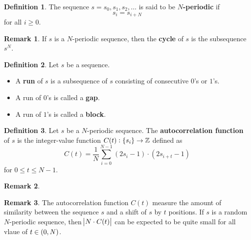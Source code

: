 \documentclass[12pt,openany]{book}
\theoremstyle{definition}
\newtheorem{definition}{Definition}[chapter]
\newtheorem{remark}{Remark}[chapter]
\newcommand{\Z}{\mathbb{Z}}
\begin{document}
	\begin{tcolorbox}[colback=white,colframe=defcolor,arc=5pt,title={\color{white}\bf $N$-Periodic}]
		\begin{definition}
			The sequence $s=s_0,s_1,s_2,\dots$ is said to be \textbf{$N$-periodic} if \[
			s_i=s_{i+N}
			\] for all $i\geq 0$.
		\end{definition}
	\end{tcolorbox}
	\begin{remark}
		If $s$ is a $N$-periodic sequence, then the \textbf{cycle} of $s$ is the subsequence $s^N$.
	\end{remark}
	\vspace{12pt}
	\begin{tcolorbox}[colback=white,colframe=defcolor,arc=5pt,title={\color{white}\bf Run - Gap / Block}]
		\begin{definition}
			Let $s$ be a sequence. \begin{itemize}
				\item A \textbf{run} of $s$ is a subsequence of $s$ consisting of consecutive $0$'s or $1$'s.
				\item A run of $0$'s is called a \textbf{gap}.
				\item A run of $1$'s is called a \textbf{block}.
			\end{itemize}
		\end{definition}
	\end{tcolorbox}
	\vspace{24pt}
	\newpage
	\begin{tcolorbox}[colback=white,colframe=defcolor,arc=5pt,title={\color{white}\bf Autocorrelation Function}]
		\begin{definition}
			Let $s$ be a $N$-periodic sequence. The \textbf{autocorrelation function} of $s$ is the integer-value function $C(t):\set{s_i}\to\Z$ defined as \[
			C(t) = \frac{1}{N}\sum_{i=0}^{N-1}(2s_i - 1) \cdot (2s_{i+t} - 1)
			\] for $0\leq t\leq N-1$.
		\end{definition}
	\end{tcolorbox}
	\begin{remark}
		
	\end{remark}
	\begin{remark}
		The autocorrelation function $C(t)$ measure the amount of similarity between the sequence $s$ and a shift of $s$ by $t$ positions. If $s$ is a random $N$-periodic sequence, then $\abs{N\cdot C(t)}$ can be expected to be quite small for all vlaue of $t\in\intoo{0,N}$. 
	\end{remark}
\end{document}

